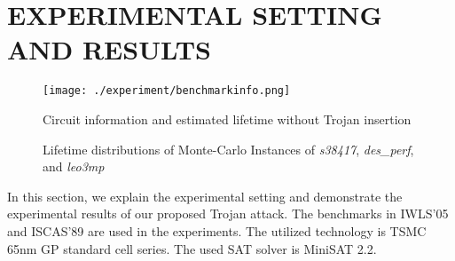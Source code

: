 \section{EXPERIMENTAL SETTING AND RESULTS}
\label{sec:mot}
\begin{figure}
	\centering
	\texttt{[image: ./experiment/benchmarkinfo.png]}
	\caption{Circuit information and estimated lifetime without Trojan insertion}
	\label{fig:benchmark}
\end{figure}

\begin{figure*}[!ht]
    \centering
    \hspace{0.1cm}
    \hspace{0.1cm}
    \hspace{0.1cm}
    \caption{Lifetime distributions of Monte-Carlo Instances of \textit{s38417}, \textit{des\_perf}, and \textit{leo3mp}}
    \label{fig:exp}
\end{figure*}


In this section, we explain the experimental setting and demonstrate the experimental results of our proposed Trojan attack. The benchmarks in IWLS'05 and ISCAS'89 are used in the experiments. The utilized technology is TSMC 65nm GP standard cell series. The used SAT solver is MiniSAT 2.2. %

